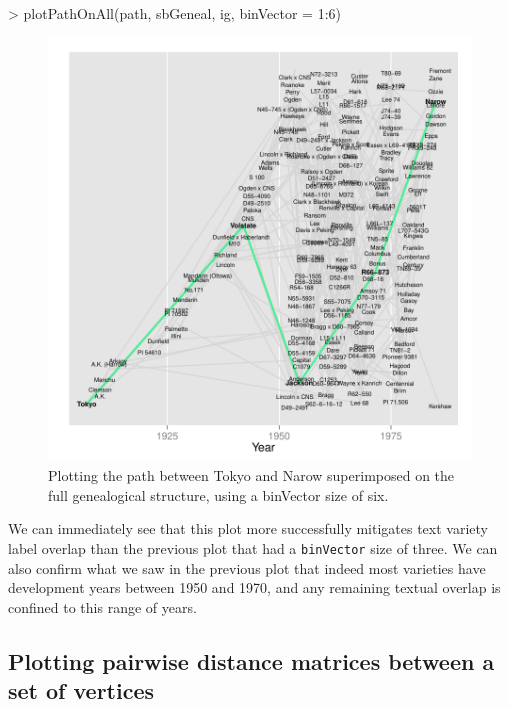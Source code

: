 \documentclass{article}
\numberwithin{equation}{section} %
\begin{document}
\begin{Schunk}
\begin{Sinput}
> plotPathOnAll(path, sbGeneal, ig, binVector = 1:6)
\end{Sinput}
\end{Schunk}

\begin{figure} 
  \begin{center} 
\includegraphics{ggenealogy-plotPathOnAll2}
\end{center} 
\caption{Plotting the path between Tokyo and Narow superimposed on the full genealogical structure, using a binVector size of six.}
\label{fig:plotPathOnAll2}
\end{figure}

We can immediately see that this plot more successfully mitigates text variety label overlap than the previous plot that had a \texttt{binVector} size of three. We can also confirm what we saw in the previous plot that indeed most varieties have development years between 1950 and 1970, and any remaining textual overlap is confined to this range of years.

\subsection{Plotting pairwise distance matrices between a set of vertices}
\end{document}
